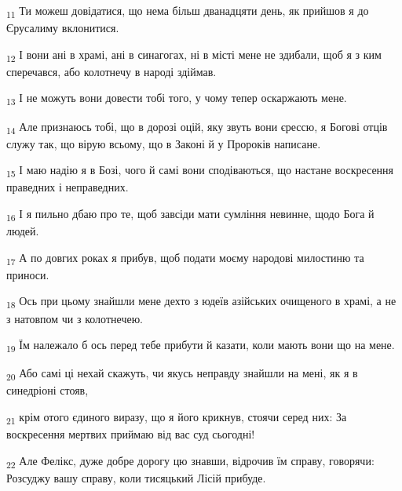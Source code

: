 \begin{tcolorbox}
\textsubscript{11} Ти можеш довідатися, що нема більш дванадцяти день, як прийшов я до Єрусалиму вклонитися.
\end{tcolorbox}
\begin{tcolorbox}
\textsubscript{12} І вони ані в храмі, ані в синагогах, ні в місті мене не здибали, щоб я з ким сперечався, або колотнечу в народі здіймав.
\end{tcolorbox}
\begin{tcolorbox}
\textsubscript{13} І не можуть вони довести тобі того, у чому тепер оскаржають мене.
\end{tcolorbox}
\begin{tcolorbox}
\textsubscript{14} Але признаюсь тобі, що в дорозі оцій, яку звуть вони єрессю, я Богові отців служу так, що вірую всьому, що в Законі й у Пророків написане.
\end{tcolorbox}
\begin{tcolorbox}
\textsubscript{15} І маю надію я в Бозі, чого й самі вони сподіваються, що настане воскресення праведних і неправедних.
\end{tcolorbox}
\begin{tcolorbox}
\textsubscript{16} І я пильно дбаю про те, щоб завсіди мати сумління невинне, щодо Бога й людей.
\end{tcolorbox}
\begin{tcolorbox}
\textsubscript{17} А по довгих роках я прибув, щоб подати моєму народові милостиню та приноси.
\end{tcolorbox}
\begin{tcolorbox}
\textsubscript{18} Ось при цьому знайшли мене дехто з юдеїв азійських очищеного в храмі, а не з натовпом чи з колотнечею.
\end{tcolorbox}
\begin{tcolorbox}
\textsubscript{19} Їм належало б ось перед тебе прибути й казати, коли мають вони що на мене.
\end{tcolorbox}
\begin{tcolorbox}
\textsubscript{20} Або самі ці нехай скажуть, чи якусь неправду знайшли на мені, як я в синедріоні стояв,
\end{tcolorbox}
\begin{tcolorbox}
\textsubscript{21} крім отого єдиного виразу, що я його крикнув, стоячи серед них: За воскресення мертвих приймаю від вас суд сьогодні!
\end{tcolorbox}
\begin{tcolorbox}
\textsubscript{22} Але Фелікс, дуже добре дорогу цю знавши, відрочив їм справу, говорячи: Розсуджу вашу справу, коли тисяцький Лісій прибуде.
\end{tcolorbox}
